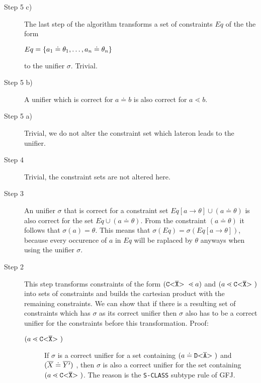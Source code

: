 \documentclass[acmsmall,screen,review]{acmart}
\begin{document}
\begin{description}
\item[Step 5 c)]
The last step of the algorithm transforms a set of constraints $Eq$ of the the form

$Eq = \{ a_1 \doteq \theta_1, \ldots , a_n \doteq \theta_n \}$

to the unifier $\sigma$.
Trivial.

\item[Step 5 b)]
A unifier which is correct for $a \doteq b$ is also correct for $a \lessdot b$.

\item[Step 5 a)]
Trivial, we do not alter the constraint set which lateron leads to the unifier.

\item[Step 4]
Trivial, the constraint sets are not altered here.

\item[Step 3]
An unifier $\sigma$ that is correct for a constraint set
$Eq[a \to \theta] \cup (a \doteq \theta)$ is also correct for
the set $Eq \cup (a \doteq \theta)$.
From the constraint $(a \doteq \theta)$ it follows that $\sigma(a) = \theta$.
This means that $\sigma(Eq) = \sigma(Eq[a \to \theta])$,
because every occurence of $a$ in $Eq$ will be raplaced by $\theta$ anyways when using the unifier $\sigma$.

\item[Step 2]
This step transforms constraints of the form $(\mathtt{C {\tt <} \overline{X} {\tt >} \ } \lessdot a)$ and $(a \lessdot \mathtt{C {\tt <} \overline{X} {\tt >} \ })$
into sets of constraints and builds the cartesian product with the remaining constraints.
We can show that if there is a resulting set of constraints which has $\sigma$ as its correct unifier
then $\sigma$ also has to be a correct unifier for the constraints before this transformation.
Proof:

\begin{description}
\item[$(a \lessdot \mathtt{C {\tt <} \overline{X} {\tt >} \ })$] If $\sigma$ is a correct unifier for a set containing $(a \doteq \mathtt{D {\tt <} \overline{A} {\tt >} \ })$
and $(\overline{X} \doteq \overline{Y'})$
, then $\sigma$ is also a correct unifier for the set containing $(a \lessdot \mathtt{C {\tt <} \overline{X} {\tt >} \ })$.
The reason is the \texttt{S-CLASS} subtype rule of GFJ. %


\end{description}
\end{description}
\end{document}
